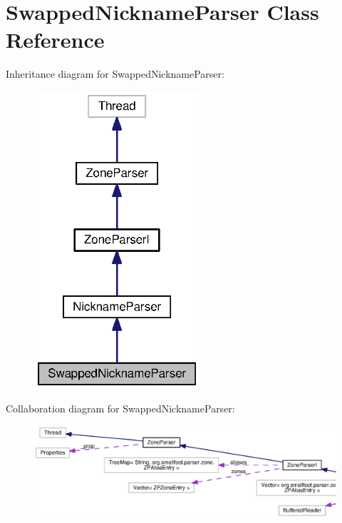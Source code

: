 \section{Swapped\+Nickname\+Parser Class Reference}
\label{classorg_1_1smallfoot_1_1parser_1_1zone_1_1SwappedNicknameParser}


Inheritance diagram for Swapped\+Nickname\+Parser\+:
\nopagebreak
\begin{figure}[H]
\begin{center}
\leavevmode
\includegraphics[width=174pt]{classorg_1_1smallfoot_1_1parser_1_1zone_1_1SwappedNicknameParser__inherit__graph}
\end{center}
\end{figure}


Collaboration diagram for Swapped\+Nickname\+Parser\+:
\nopagebreak
\begin{figure}[H]
\begin{center}
\leavevmode
\includegraphics[width=350pt]{classorg_1_1smallfoot_1_1parser_1_1zone_1_1SwappedNicknameParser__coll__graph}
\end{center}
\end{figure}
